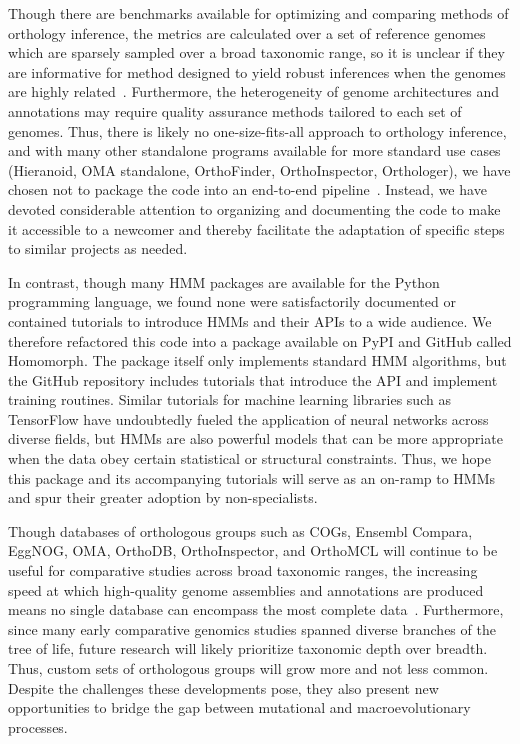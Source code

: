 \documentclass[10pt,letterpaper]{article}
\begin{document}
Though there are benchmarks available for optimizing and comparing methods of orthology inference, the metrics are calculated over a set of reference genomes which are sparsely sampled over a broad taxonomic range, so it is unclear if they are informative for method designed to yield robust inferences when the genomes are highly related~\cite{Nevers2022}. Furthermore, the heterogeneity of genome architectures and annotations may require quality assurance methods tailored to each set of genomes. Thus, there is likely no one-size-fits-all approach to orthology inference, and with many other standalone programs available for more standard use cases (Hieranoid, OMA standalone, OrthoFinder, OrthoInspector, Orthologer), we have chosen not to package the code into an end-to-end pipeline~\cite{Kaduk2017, Altenhoff2019, Emms2019, Linard2014, Zdobnov2020}. Instead, we have devoted considerable attention to organizing and documenting the code to make it accessible to a newcomer and thereby facilitate the adaptation of specific steps to similar projects as needed.

In contrast, though many HMM packages are available for the Python programming language, we found none were satisfactorily documented or contained tutorials to introduce HMMs and their APIs to a wide audience. We therefore refactored this code into a package available on PyPI and GitHub called Homomorph. The package itself only implements standard HMM algorithms, but the GitHub repository includes tutorials that introduce the API and implement training routines. Similar tutorials for machine learning libraries such as TensorFlow have undoubtedly fueled the application of neural networks across diverse fields, but HMMs are also powerful models that can be more appropriate when the data obey certain statistical or structural constraints. Thus, we hope this package and its accompanying tutorials will serve as an on-ramp to HMMs and spur their greater adoption by non-specialists.

Though databases of orthologous groups such as COGs, Ensembl Compara, EggNOG, OMA, OrthoDB, OrthoInspector, and OrthoMCL will continue to be useful for comparative studies across broad taxonomic ranges, the increasing speed at which high-quality genome assemblies and annotations are produced means no single database can encompass the most complete data~\cite{Galperin2020, Herrero2016, HuertaCepas2018, Altenhoff2020, Zdobnov2020, Nevers2018, Chen2006}. Furthermore, since many early comparative genomics studies spanned diverse branches of the tree of life, future research will likely prioritize taxonomic depth over breadth. Thus, custom sets of orthologous groups will grow more and not less common. Despite the challenges these developments pose, they also present new opportunities to bridge the gap between mutational and macroevolutionary processes.
\end{document}
